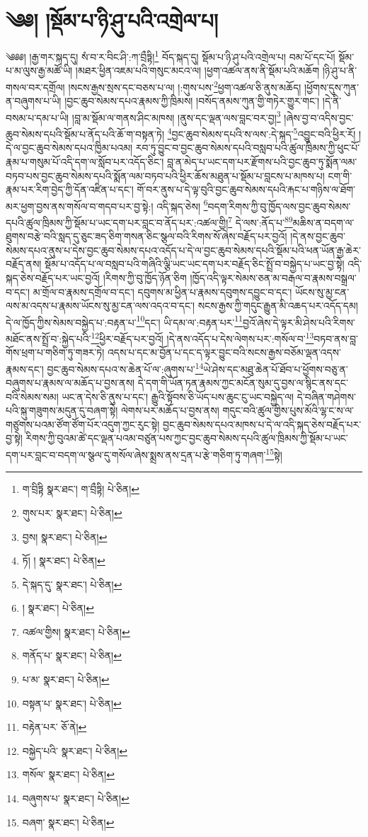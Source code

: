 \setcounter{footnote}{0} 
\chapter{༄༅། །སྡོམ་པ་ཉི་ཤུ་པའི་འགྲེལ་པ།}༄༅༅། །རྒྱ་གར་སྐད་དུ། སཾ་བ་ར་བིང་ཤི་:ཀ་བྲྀཏྟི།\footnote{ག་བྲིཏྟི  སྣར་ཐང་། ག་བྲྀཏྟི།  པེ་ཅིན། } བོད་སྐད་དུ། སྡོམ་པ་ཉི་ཤུ་པའི་འགྲེལ་པ། བམ་པོ་དང་པོ། སྡོམ་པ་མ་ལུས་རྒྱ་མཚོ་ཡི། །མཐར་ཕྱིན་འཇམ་པའི་གསུང་མངའ་ལ། །ཕྱག་འཚལ་ནས་ནི་སྡོམ་པའི་མཆོག །ཉི་ཤུ་པ་ནི་གསལ་བར་དགྲོལ། །སངས་རྒྱས་སྲས་དང་བཅས་པ་ལ། །:གུས་པས་\footnote{གུས་པར་  སྣར་ཐང་།  པེ་ཅིན། }ཕྱག་འཚལ་ཅི་ནུས་མཆོད། །ཕྱོགས་དུས་ཀུན་ན་བཞུགས་པ་ཡི། །བྱང་ཆུབ་སེམས་དཔའ་རྣམས་ཀྱི་ཁྲིམས། །བསོད་ནམས་ཀུན་གྱི་གཏེར་གྱུར་གང་། །དེ་ནི་བསམ་པ་དམ་པ་ཡི། །བླ་མ་སྡོམ་ལ་གནས་ཤིང་མཁས། །ནུས་དང་ལྡན་ལས་བླང་བར་བྱ།\footnote{བྱས།  སྣར་ཐང་།  པེ་ཅིན། } །ཞེས་བྱ་བ་འདིས་བྱང་ཆུབ་སེམས་དཔའི་སྡོམ་པ་ནོད་པའི་ཆོ་ག་བསྟན་ཏེ། \footnote{ཏོ། །   སྣར་ཐང་།  པེ་ཅིན། }བྱང་ཆུབ་སེམས་དཔའི་ས་ལས་:དེ་སྐད་\footnote{དེ་སྐད་དུ་  སྣར་ཐང་།  པེ་ཅིན། }འབྱུང་བའི་ཕྱིར་རོ། །དེ་ལ་བྱང་ཆུབ་སེམས་དཔའ་ཁྱིམ་པའམ། རབ་ཏུ་བྱུང་བ་བྱང་ཆུབ་སེམས་དཔའི་བསླབ་པའི་ཚུལ་ཁྲིམས་ཀྱི་ཕུང་པོ་རྣམ་པ་གསུམ་པོ་འདི་དག་ལ་སློབ་པར་འདོད་ཅིང་། བླ་ན་མེད་པ་ཡང་དག་པར་རྫོགས་པའི་བྱང་ཆུབ་ཏུ་སྨོན་ལམ་བཏབ་པས་བྱང་ཆུབ་སེམས་དཔའི་སྨོན་ལམ་བཏབ་པའི་ཕྱིར་ཆོས་མཐུན་པ་སྡོམ་པ་བླངས་པ་མཁས་པ། ངག་གི་རྣམ་པར་རིག་བྱེད་ཀྱི་དོན་འཛིན་པ་དང་། གོ་བར་ནུས་པ་དེ་ལྟ་བུའི་བྱང་ཆུབ་སེམས་དཔའི་རྐང་པ་གཉིས་ལ་ཐོག་མར་ཕྱག་བྱས་ནས་གསོལ་བ་གདབ་པར་བྱ་སྟེ:། འདི་སྐད་ཅེས། \footnote{།    སྣར་ཐང་།  པེ་ཅིན། }བདག་རིགས་ཀྱི་བུ་ཁྱོད་ལས་བྱང་ཆུབ་སེམས་དཔའི་ཚུལ་ཁྲིམས་ཀྱི་སྡོམ་པ་ཡང་དག་པར་བླང་བ་ནོད་པར་:འཚལ་གྱི།\footnote{འཚལ་གྱིས།  སྣར་ཐང་།  པེ་ཅིན། } དེ་ལས་:ནོད་པ་\footnote{གནོད་པ་  སྣར་ཐང་།  པེ་ཅིན། }\footnote{པ་མ་  སྣར་ཐང་།  པེ་ཅིན། }མཆིས་ན་བདག་ལ་ཐུགས་བརྩེ་བའི་སླད་དུ་ཅུང་ཟད་ཅིག་གསན་ཅིང་སྩལ་བའི་རིགས་སོ་ཞེས་བརྗོད་པར་བྱའོ། །དེ་ནས་བྱང་ཆུབ་སེམས་དཔའ་ནུས་པ་དེས་བྱང་ཆུབ་སེམས་དཔའ་འདོད་པ་དེ་ལ་བྱང་ཆུབ་སེམས་དཔའི་སྡོམ་པའི་ཕན་ཡོན་རྒྱ་ཆེར་བརྗོད་ནས། སྡོམ་པ་འདོད་པ་ལ་བསླབ་པའི་གཞིའི་ལྕི་ཡང་ཡང་དག་པར་བརྗོད་ཅིང་སྤྲོ་བ་བསྐྱེད་པ་ཡང་བྱ་སྟེ། འདི་སྐད་ཅེས་བརྗོད་པར་ཡང་བྱའོ། །རིགས་ཀྱི་བུ་ཁྱོད་ཉོན་ཅིག །ཁྱོད་འདི་ལྟར་སེམས་ཅན་མ་བརྒལ་བ་རྣམས་བསྒྲལ་བ་དང་། མ་གྲོལ་བ་རྣམས་དགྲོལ་བ་དང་། དབུགས་མ་ཕྱིན་པ་རྣམས་དབུགས་དབྱུང་བ་དང་། ཡོངས་སུ་མྱ་ངན་ལས་མ་འདས་པ་རྣམས་ཡོངས་སུ་མྱ་ངན་ལས་འདའ་བ་དང་། སངས་རྒྱས་ཀྱི་གདུང་རྒྱུན་མི་འཆད་པར་འདོད་དམ། དེ་ལ་ཁྱོད་ཀྱིས་སེམས་བསྐྱེད་པ་:བརྟན་པ་\footnote{བསྟན་པ་  སྣར་ཐང་།  པེ་ཅིན། }དང་། ཡི་དམ་ལ་:བརྟན་པར་\footnote{བརྟེན་པར་  ཅོ་ནེ། }བྱའོ་ཞེས་དེ་ལྟར་མི་ཤེས་པའི་རིགས་མཐོང་ནས་སྤྲོ་བ་:སྐྱེད་པའི་\footnote{བསྐྱེད་པའི་  སྣར་ཐང་།  པེ་ཅིན། }ཕྱིར་བརྗོད་པར་བྱའོ། །དེ་ནས་འདོད་པ་དེས་ལེགས་པར་:གསོལ་བ་\footnote{གསོལ་  སྣར་ཐང་།  པེ་ཅིན། }བཏབ་ནས་བླ་གོས་ཕྲག་པ་གཅིག་ཏུ་གཟར་ཏེ། འདས་པ་དང་མ་བྱོན་པ་དང་ད་ལྟར་བྱུང་བའི་སངས་རྒྱས་བཅོམ་ལྡན་འདས་རྣམས་དང་། བྱང་ཆུབ་སེམས་དཔའ་ས་ཆེན་པོ་ལ་:ཞུགས་པ་\footnote{བཞུགས་པ་  སྣར་ཐང་།  པེ་ཅིན། }ཡེ་ཤེས་དང་མཐུ་ཆེན་པོ་ཐོབ་པ་ཕྱོགས་བཅུ་ན་བཞུགས་པ་རྣམས་ལ་མཆོད་པ་བྱས་ནས། དེ་དག་གི་ཡོན་ཏན་རྣམས་ཀྱང་མངོན་སུམ་དུ་བྱས་ལ་སྙིང་ནས་དང་བའི་སེམས་སམ། ཡང་ན་དེས་ཅི་ནུས་པ་དང་། རྒྱུའི་སྟོབས་ཅི་ཡོད་པས་ཆུང་ངུ་ཡང་བསྐྱེད་ལ། དེ་བཞིན་གཤེགས་པའི་སྐུ་གཟུགས་མདུན་དུ་བཞག་སྟེ། ལེགས་པར་མཆོད་པ་བྱས་ནས། གདུང་བའི་ཚུལ་གྱིས་པུས་མོའི་ལྷ་ང་ས་ལ་གཙུགས་པའམ་ཙོག་ཙོག་པོར་འདུག་ཀྱང་རུང་སྟེ། བྱང་ཆུབ་སེམས་དཔའ་མཁས་པ་དེ་ལ་འདི་སྐད་ཅེས་བརྗོད་པར་བྱ་སྟེ། རིགས་ཀྱི་བུའམ་ཚེ་དང་ལྡན་པའམ་བཙུན་པས་ཀྱང་བྱང་ཆུབ་སེམས་དཔའི་ཚུལ་ཁྲིམས་ཀྱི་སྡོམ་པ་ཡང་དག་པར་བླང་བ་བདག་ལ་སྩལ་དུ་གསོལ་ཞེས་སྨྲས་ནས་དྲན་པ་རྩེ་གཅིག་ཏུ་གཞག་\footnote{བཞག་  སྣར་ཐང་།  པེ་ཅིན། }སྟེ། 
